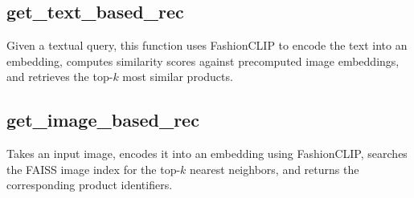 \vspace{-1.25em}
\subsection*{get\_text\_based\_rec}
Given a textual query, this function uses FashionCLIP to encode the text into an embedding, computes similarity scores against precomputed image embeddings, and retrieves the top-$k$ most similar products.

\vspace{-1.25em}
\subsection*{get\_image\_based\_rec}
Takes an input image, encodes it into an embedding using FashionCLIP, searches the FAISS image index for the top-$k$ nearest neighbors, and returns the corresponding product identifiers.

